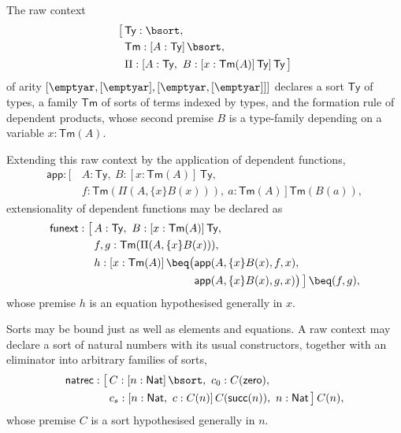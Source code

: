 \begin{example}\label{ex:raw-context}
    The raw context
    \[
    \begin{aligned}
        \big[\,&\mathsf{Ty} : \bsort,\\
        &\mathsf{Tm} : [A : \mathsf{Ty}]\,\bsort,\\
        &\Pi : [A : \mathsf{Ty},\ B : [x : \mathsf{Tm}(A)]\,\mathsf{Ty}]\,\mathsf{Ty}\,\big]
    \end{aligned}
    \]
    of arity $[\emptyar, [\emptyar], [\emptyar, [\emptyar]]]$ declares a sort $\mathsf{Ty}$ of types, a family $\mathsf{Tm}$ of sorts of terms indexed by types, and the formation rule of dependent products, whose second premise $B$ is a type-family depending on a variable $x : \mathsf{Tm}(A)$.
    
    Extending this raw context by the application of dependent functions,
    \[
    \begin{aligned}
        \mathsf{app} : \big[\,&A : \mathsf{Ty},\ B : [x : \mathsf{Tm}(A)]\,\mathsf{Ty},\\
        &f : \mathsf{Tm}(\Pi(A, \{x\}B(x))),\ a : \mathsf{Tm}(A)\,\big]\,\mathsf{Tm}(B(a)),
    \end{aligned}
    \]
    extensionality of dependent functions may be declared as
    \[
    \begin{aligned}
        \mathsf{funext} : \big[\,&A : \mathsf{Ty},\ B : [x : \mathsf{Tm}(A)]\,\mathsf{Ty},\\
        &f, g : \mathsf{Tm}(\Pi(A, \{x\}B(x))),\\
        &h : [x : \mathsf{Tm}(A)]\,\beq\big(\mathsf{app}(A, \{x\}B(x), f, x),\\
        &\hphantom{h : [x : \mathsf{Tm}(A)]\,\beq\big(}\mathsf{app}(A, \{x\}B(x), g, x)\big)\,\big]\,\beq(f, g),
    \end{aligned}
    \]
    whose premise $h$ is an equation hypothesised generally in $x$.

    Sorts may be bound just as well as elements and equations. A raw context may declare a sort of natural numbers with its usual constructors, together with an eliminator into arbitrary families of sorts,
    \[
    \begin{aligned}
        \mathsf{natrec} : \big[\,&C : [n : \mathsf{Nat}]\,\bsort,\ c_0 : C(\mathsf{zero}),\\
        &c_s : [n : \mathsf{Nat},\ c : C(n)]\,C(\mathsf{succ}(n)),\ n : \mathsf{Nat}\,\big]\,C(n),
    \end{aligned}
    \]
    whose premise $C$ is a sort hypothesised generally in $n$.
\end{example}

